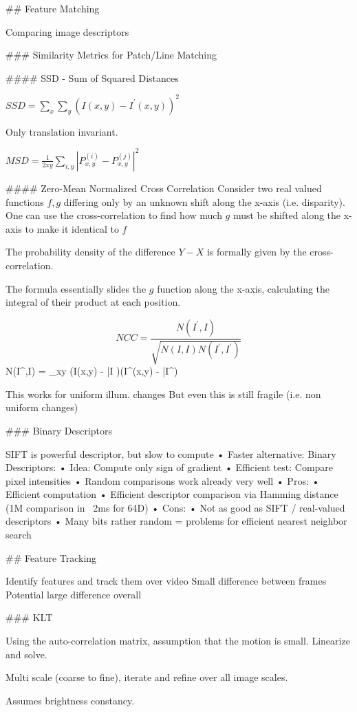 ## Feature Matching

Comparing image descriptors

### Similarity Metrics for Patch/Line Matching

#### SSD - Sum of Squared Distances

$SSD = \sum_x \sum_y (I(x,y) - I^\prime(x,y))^2$

Only translation invariant.

$MSD=\frac{1}{2xy} \sum_{i,y}\left|P_{x,y}^{(i)} - P^{(j)}_{x,y}\right|^2$


#### Zero-Mean Normalized Cross Correlation
Consider two real valued functions  $f,g$  differing only by an unknown shift along the x-axis (i.e. disparity). One can use the cross-correlation to find how much $g$ must be shifted along the x-axis to make it identical to $f$ 

The probability density of the difference $Y-X$ is formally given by the cross-correlation.

The formula essentially slides the $g$ function along the x-axis, calculating the integral of their product at each position.

$$ NCC = \frac{N(I^\prime,I)}{\sqrt{N(I,I)N(I^\prime,I^\prime)}}
$$ N(I^\prime,I) = \sum_{xy} (I(x,y) - \bar I )(I^\prime(x,y) - \bar I^\prime ) $$

This works for uniform illum. changes
But even this is still fragile (i.e. non uniform changes)

### Binary Descriptors 

SIFT is powerful descriptor, but slow to compute
• Faster alternative: Binary Descriptors:
• Idea: Compute only sign of gradient
• Efficient test: Compare pixel intensities
• Random comparisons work already very well
• Pros:
• Efficient computation
• Efficient descriptor comparison via Hamming distance (1M comparison in ~2ms for 64D)
• Cons:
• Not as good as SIFT / real-valued descriptors
• Many bits rather random = problems for efficient nearest neighbor search


## Feature Tracking

Identify features and track them over video
Small difference between frames
Potential large difference overall

### KLT

Using the auto-correlation matrix, assumption that the motion is small.
Linearize and solve.

Multi scale (coarse to fine), iterate and refine over all image scales.

Assumes brightness constancy.

